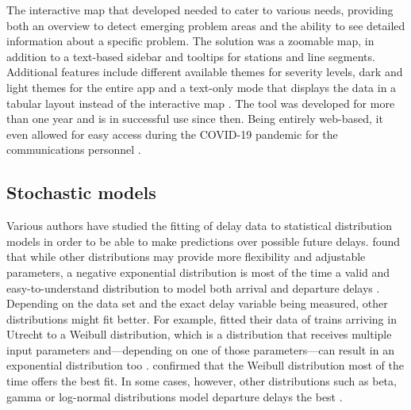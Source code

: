 The interactive map that \textcite{caspari-2021} developed needed to cater to various needs, providing both an overview to detect emerging problem areas and the ability to see detailed information about a specific problem. The solution was a zoomable map, in addition to a text-based sidebar and tooltips for stations and line segments. Additional features include different available themes for severity levels, dark and light themes for the entire app and a text-only mode that displays the data in a tabular layout instead of the interactive map \autocite[8--9]{caspari-2021}. The tool was developed for more than one year and is in successful use since then. Being entirely web-based, it even allowed for easy access during the COVID-19 pandemic for the communications personnel \autocite[11]{caspari-2021}.

\subsection{Stochastic models}

Various authors have studied the fitting of delay data to statistical distribution models in order to be able to make predictions over possible future delays. \textcite{yuan-2008} found that while other distributions may provide more flexibility and adjustable parameters, a negative exponential distribution is most of the time a valid and easy-to-understand distribution to model both arrival and departure delays \autocite[173--174]{yuan-2008}. Depending on the data set and the exact delay variable being measured, other distributions might fit better. For example, \textcite[90]{goverde-2013} fitted their data of trains arriving in Utrecht to a Weibull distribution, which is a distribution that receives multiple input parameters and---depending on one of those parameters---can result in an exponential distribution too \autocite[88]{hallinan-1993}. \textcite[61]{yuan-2006} confirmed that the Weibull distribution most of the time offers the best fit. In some cases, however, other distributions such as beta, gamma or log-normal distributions model departure delays the best \autocite[61]{yuan-2006}.


